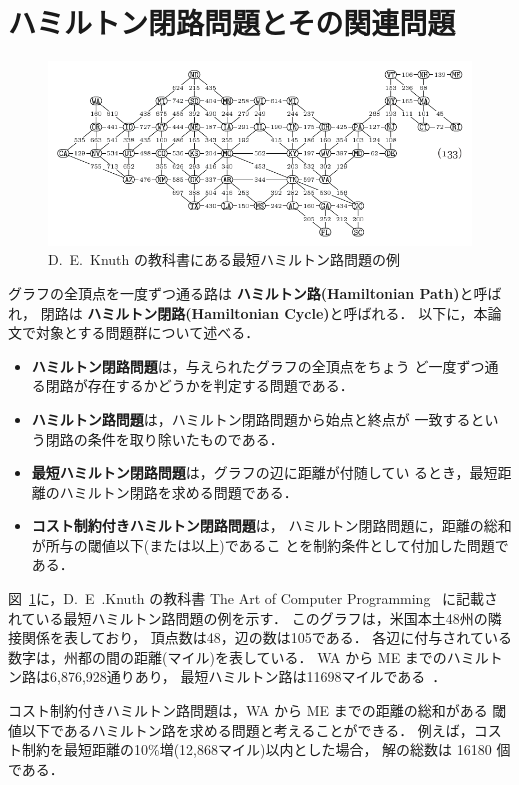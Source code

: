 \section{ハミルトン閉路問題とその関連問題}\label{chap:background}

\begin{figure}[tb]
  \centering
  \includegraphics[width=0.9\linewidth]{fig/taocp_vol4fasc1b_p52_eq133.pdf}
  \caption{D.~E.~Knuth の教科書にある最短ハミルトン路問題の例}
  \label{fig:USmap}
\end{figure}

グラフの全頂点を一度ずつ通る路は
\textbf{ハミルトン路(Hamiltonian Path)}と呼ばれ，
閉路は
\textbf{ハミルトン閉路(Hamiltonian Cycle)}と呼ばれる．
以下に，本論文で対象とする問題群について述べる．

\begin{itemize}
\item \textbf{ハミルトン閉路問題}は，与えられたグラフの全頂点をちょう
  ど一度ずつ通る閉路が存在するかどうかを判定する問題である．
\item \textbf{ハミルトン路問題}は，ハミルトン閉路問題から始点と終点が
  一致するという閉路の条件を取り除いたものである．
\item \textbf{最短ハミルトン閉路問題}は，グラフの辺に距離が付随してい
  るとき，最短距離のハミルトン閉路を求める問題である．
\item \textbf{コスト制約付きハミルトン閉路問題}は，
  ハミルトン閉路問題に，距離の総和が所与の閾値以下(または以上)であるこ
  とを制約条件として付加した問題である\cite{comp20:Minato}．
\end{itemize}

図~\ref{fig:USmap}に，D.~E~.Knuth の教科書
The Art of Computer Programming~\cite{Knuth:TAOCP:SAT}
に記載されている最短ハミルトン路問題の例を示す．
このグラフは，米国本土48州の隣接関係を表しており，
頂点数は48，辺の数は105である．
各辺に付与されている数字は，州都の間の距離(マイル)を表している．
WA から ME までのハミルトン路は6,876,928通りあり，
最短ハミルトン路は11698マイルである~\cite{comp20:Minato}．

コスト制約付きハミルトン路問題は，WA から ME までの距離の総和がある
閾値以下であるハミルトン路を求める問題と考えることができる．
例えば，コスト制約を最短距離の10\%増(12,868マイル)以内とした場合，
解の総数は 16180 個である．

